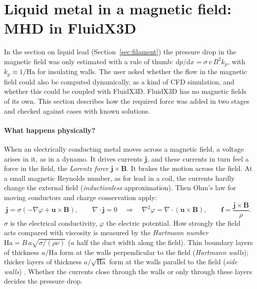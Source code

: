 \section{Liquid metal in a magnetic field: MHD in FluidX3D}\label{sec:mhd}

In the section on liquid lead (Section~\ref{sec:filament}) the pressure drop in the magnetic field was only estimated
with a rule of thumb: $\mathrm{d}p/\mathrm{d}x = \sigma\,v\,B^2 k_p$, with $k_p \approx 1/\mathrm{Ha}$ for insulating
walls. The user asked whether the flow in the magnetic field could also be computed dynamically, as a kind of CFD
simulation, and whether this could be coupled with FluidX3D. FluidX3D has no magnetic fields of its own. This section
describes how the required force was added in two stages and checked against cases with known solutions.

\paragraph{What happens physically?} When an electrically conducting metal moves across a magnetic field, a voltage
arises in it, as in a dynamo. It drives currents $\mathbf{j}$, and these currents in turn feel a force in the field,
the \emph{Lorentz force} $\mathbf{j}\times\mathbf{B}$. It brakes the motion across the field. At a small magnetic
Reynolds number, as for lead in a coil, the currents hardly change the external field (\emph{inductionless}
approximation). Then Ohm's law for moving conductors and charge conservation apply:
\[
\mathbf{j} = \sigma\left(-\nabla\varphi + \mathbf{u}\times\mathbf{B}\right),\qquad \nabla\cdot\mathbf{j} = 0
\quad\Rightarrow\quad \nabla^2\varphi = \nabla\cdot(\mathbf{u}\times\mathbf{B}),\qquad
\mathbf{f} = \frac{\mathbf{j}\times\mathbf{B}}{\rho}.
\]
$\sigma$ is the electrical conductivity, $\varphi$ the electric potential. How strongly the field acts compared with
viscosity is measured by the \emph{Hartmann number} $\mathrm{Ha} = B\,a\sqrt{\sigma/(\rho\nu)}$ ($a$ half the duct
width along the field). Thin boundary layers of thickness $a/\mathrm{Ha}$ form at the walls perpendicular to the field
(\emph{Hartmann walls}); thicker layers of thickness $a/\sqrt{\mathrm{Ha}}$ form at the walls parallel to the field
(\emph{side walls}) \cite{huntshercliff1971}. Whether the currents close through the walls or only through these
layers decides the pressure drop.

